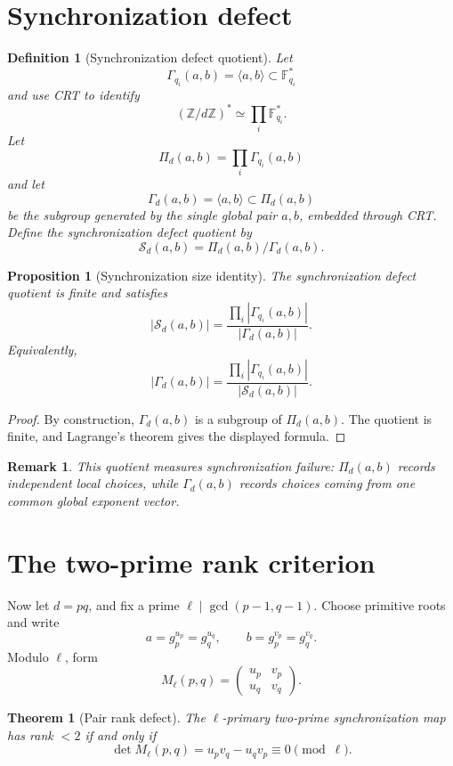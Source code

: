 \documentclass[11pt]{article}
\newtheorem{theorem}{Theorem}
\newtheorem{proposition}{Proposition}
\newtheorem{definition}{Definition}
\newtheorem{remark}{Remark}
\newcommand{\Z}{\mathbb Z}
\newcommand{\F}{\mathbb F}
\newcommand{\1}{\mathbf 1}
\begin{document}
\section{Synchronization defect}

\begin{definition}[Synchronization defect quotient]
Let
\[
\Gamma_{q_i}(a,b)=\langle a,b\rangle\subset\F_{q_i}^*
\]
and use CRT to identify
\[
(\Z/d\Z)^*\simeq\prod_i\F_{q_i}^*.
\]
Let
\[
\Pi_d(a,b)=\prod_i\Gamma_{q_i}(a,b)
\]
and let
\[
\Gamma_d(a,b)=\langle a,b\rangle\subset \Pi_d(a,b)
\]
be the subgroup generated by the single global pair \(a,b\), embedded through CRT. Define the synchronization defect quotient by
\[
\mathcal S_d(a,b)=\Pi_d(a,b)/\Gamma_d(a,b).
\]
\end{definition}

\begin{proposition}[Synchronization size identity]
The synchronization defect quotient is finite and satisfies
\[
|\mathcal S_d(a,b)|
=
\frac{\prod_i|\Gamma_{q_i}(a,b)|}{|\Gamma_d(a,b)|}.
\]
Equivalently,
\[
|\Gamma_d(a,b)|=
\frac{\prod_i|\Gamma_{q_i}(a,b)|}{|\mathcal S_d(a,b)|}.
\]
\end{proposition}

\begin{proof}
By construction, \(\Gamma_d(a,b)\) is a subgroup of \(\Pi_d(a,b)\). The quotient is finite, and Lagrange's theorem gives the displayed formula.
\end{proof}

\begin{remark}
This quotient measures synchronization failure: \(\Pi_d(a,b)\) records independent local choices, while \(\Gamma_d(a,b)\) records choices coming from one common global exponent vector.
\end{remark}

\section{The two-prime rank criterion}

Now let \(d=pq\), and fix a prime \(\ell\mid\gcd(p-1,q-1)\).  Choose primitive roots and write
\[
a=g_p^{u_p}=g_q^{u_q},\qquad b=g_p^{v_p}=g_q^{v_q}.
\]
Modulo \(\ell\), form
\[
M_\ell(p,q)=
\begin{pmatrix}
u_p&v_p\\
u_q&v_q
\end{pmatrix}.
\]

\begin{theorem}[Pair rank defect]\label{T:rank}
The \(\ell\)-primary two-prime synchronization map has rank \(<2\) if and only if
\[
\det M_\ell(p,q)=u_pv_q-u_qv_p\equiv0\pmod\ell.
\]
\end{theorem}
\end{document}
